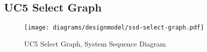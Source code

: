\subsection{UC5 Select Graph}
\begin{figure}[H]
    \centering
    \texttt{[image: diagrams/designmodel/ssd-select-graph.pdf]}
    \caption{UC5 Select Graph, System Sequence Diagram}
    \label{fig:select-graph-ssd}
\end{figure}
% 
